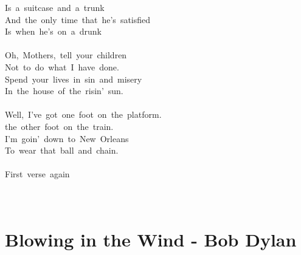 \documentclass[]{book}
\let\stdsection\section
\renewcommand\section{\clearpage\stdsection}
\begin{document}
Is~a~suitcase~and~a~trunk\\
And~the~only~time~that~he's~satisfied\\
Is~when~he's~on~a~drunk\\
~\\
Oh,~Mothers,~tell~your~children\\
Not~to~do~what~I~have~done.\\
Spend~your~lives~in~sin~and~misery\\
In~the~house~of~the~risin'~sun.\\
~\\
Well,~I've~got~one~foot~on~the~platform.\\
the~other~foot~on~the~train.\\
I'm~goin'~down~to~New~Orleans\\
To~wear~that~ball~and~chain.\\
~\\
First~verse~again\\
~\\
~\\

\hypertarget{blowing-in-the-wind---bob-dylan}{%
\section{Blowing in the Wind - Bob Dylan}\label{blowing-in-the-wind---bob-dylan}}
\end{document}
